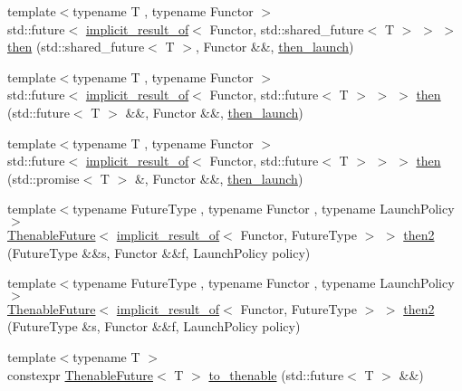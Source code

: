 \begin{DoxyCompactItemize}
{\footnotesize template$<$typename T , typename Functor $>$ }\\std\+::future$<$ \hyperlink{namespacethenable_a1ecf08d6ad8b8688d7b4df047b5feaae}{implicit\+\_\+result\+\_\+of}$<$ Functor, std\+::shared\+\_\+future$<$ T $>$ $>$ $>$ \hyperlink{namespacethenable_a234e54343659f3b576ae0565614d1c64}{then} (std\+::shared\+\_\+future$<$ T $>$, Functor \&\&, \hyperlink{namespacethenable_adf31291b806157ad914943dae5b3c94e}{then\+\_\+launch})
\item 
{\footnotesize template$<$typename T , typename Functor $>$ }\\std\+::future$<$ \hyperlink{namespacethenable_a1ecf08d6ad8b8688d7b4df047b5feaae}{implicit\+\_\+result\+\_\+of}$<$ Functor, std\+::future$<$ T $>$ $>$ $>$ \hyperlink{namespacethenable_aed748177c95e6ae1861c9921bb1c9a84}{then} (std\+::future$<$ T $>$ \&\&, Functor \&\&, \hyperlink{namespacethenable_adf31291b806157ad914943dae5b3c94e}{then\+\_\+launch})
\item 
{\footnotesize template$<$typename T , typename Functor $>$ }\\std\+::future$<$ \hyperlink{namespacethenable_a1ecf08d6ad8b8688d7b4df047b5feaae}{implicit\+\_\+result\+\_\+of}$<$ Functor, std\+::future$<$ T $>$ $>$ $>$ \hyperlink{namespacethenable_aeda63a514e4f56a1be216992fe592ada}{then} (std\+::promise$<$ T $>$ \&, Functor \&\&, \hyperlink{namespacethenable_adf31291b806157ad914943dae5b3c94e}{then\+\_\+launch})
\item 
{\footnotesize template$<$typename Future\+Type , typename Functor , typename Launch\+Policy $>$ }\\\hyperlink{classthenable_1_1_thenable_future}{Thenable\+Future}$<$ \hyperlink{namespacethenable_a1ecf08d6ad8b8688d7b4df047b5feaae}{implicit\+\_\+result\+\_\+of}$<$ Functor, Future\+Type $>$ $>$ \hyperlink{namespacethenable_a80f31095c0a474f5b645c1e00256becf}{then2} (Future\+Type \&\&s, Functor \&\&f, Launch\+Policy policy)
\item 
{\footnotesize template$<$typename Future\+Type , typename Functor , typename Launch\+Policy $>$ }\\\hyperlink{classthenable_1_1_thenable_future}{Thenable\+Future}$<$ \hyperlink{namespacethenable_a1ecf08d6ad8b8688d7b4df047b5feaae}{implicit\+\_\+result\+\_\+of}$<$ Functor, Future\+Type $>$ $>$ \hyperlink{namespacethenable_ac29edcabcae561565e668dfd0fd31217}{then2} (Future\+Type \&s, Functor \&\&f, Launch\+Policy policy)
\item 
{\footnotesize template$<$typename T $>$ }\\constexpr \hyperlink{classthenable_1_1_thenable_future}{Thenable\+Future}$<$ T $>$ \hyperlink{namespacethenable_a237a7d314a81a8be6fb40574e7454949}{to\+\_\+thenable} (std\+::future$<$ T $>$ \&\&)

\end{DoxyCompactItemize}
